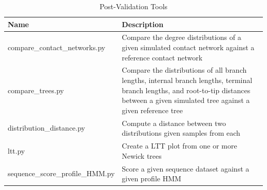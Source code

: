 \begin{table}[!ht]
\caption[Post-Validation Tools]{Post-Validation Tools}
\vspace{-0.25in}
\begin{center}
\begin{tabular}{|P{2.3in}|P{3.7in}|}
\hline
\textbf{Name} & \textbf{Description}  \\
\hline
compare\_contact\_networks.py & Compare the degree distributions of a given simulated contact network against a reference contact network \\
\hline
compare\_trees.py & Compare the distributions of all branch lengths, internal branch lengths, terminal branch lengths, and root-to-tip distances between a given simulated tree against a given reference tree \\
\hline
distribution\_distance.py & Compute a distance between two distributions given samples from each \\
\hline
ltt.py & Create a \gls{LTT} plot from one or more Newick trees \\
\hline
sequence\_score\_profile\_HMM.py & Score a given sequence dataset against a given profile \gls{HMM} \\
\hline
\end{tabular}
\end{center}
\label{tab:favites-post-validation}
\end{table}

